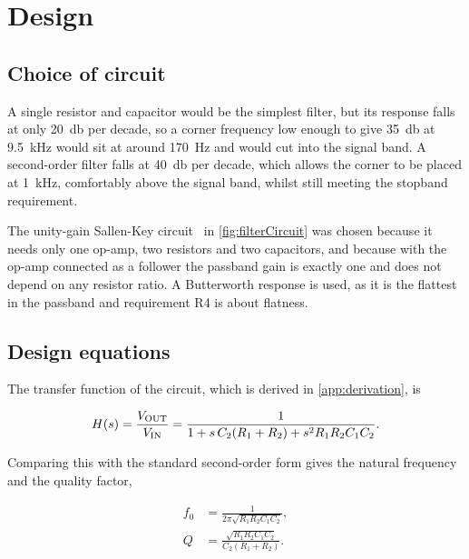 
\section{Design}
\label{sec:design}

\subsection{Choice of circuit}

A single resistor and capacitor would be the simplest filter, but its response
falls at only \qty{20}{\decibel} per decade, so a corner frequency low enough
to give \qty{35}{\decibel} at \qty{9.5}{\kilo\hertz} would sit at around
\qty{170}{\hertz} and would cut into the signal band. A second-order filter
falls at \qty{40}{\decibel} per decade, which allows the corner to be placed at
\qty{1}{\kilo\hertz}, comfortably above the signal band, whilst still meeting
the stopband requirement.

The unity-gain Sallen-Key circuit~\cite{sallen_key_1955} in
\cref{fig:filterCircuit} was chosen because it needs only one op-amp, two
resistors and two capacitors, and because with the op-amp connected as a
follower the passband gain is exactly one and does not depend on any resistor
ratio. A Butterworth response is used, as it is the flattest in the passband
and requirement R4 is about flatness.



\subsection{Design equations}

The transfer function of the circuit, which is derived in
\cref{app:derivation}, is

\begin{equation}
  \label{eq:transferFunction}
  H(s) = \frac{V_{\text{OUT}}}{V_{\text{IN}}}
       = \frac{1}{1 + s\,C_2(R_1 + R_2) + s^2 R_1 R_2 C_1 C_2}.
\end{equation}

Comparing this with the standard second-order form gives the natural frequency
and the quality factor,

\begin{align}
  \label{eq:naturalFrequency}
  f_0 &= \frac{1}{2\pi\sqrt{R_1 R_2 C_1 C_2}}, \\[4pt]
  \label{eq:qualityFactor}
  Q   &= \frac{\sqrt{R_1 R_2 C_1 C_2}}{C_2(R_1 + R_2)}.
\end{align}

